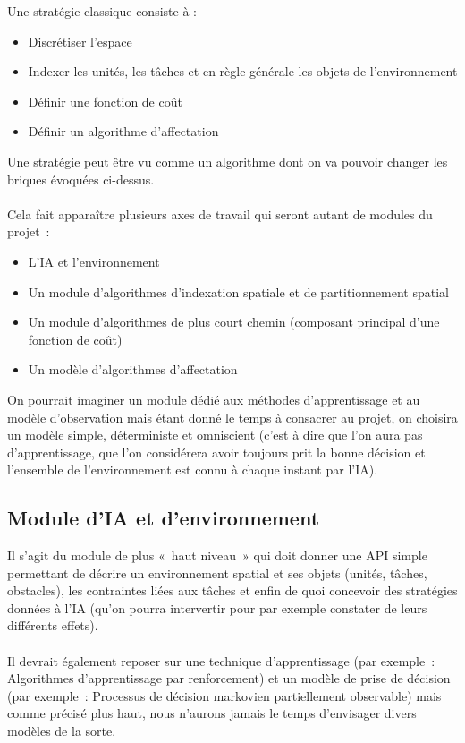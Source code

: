 Une stratégie classique consiste à :
\begin{itemize}
\item Discrétiser l'espace
\item Indexer les unités, les tâches et en règle générale les objets de l'environnement
\item Définir une fonction de coût
\item Définir un algorithme d'affectation
\end{itemize}

Une stratégie peut être vu comme un algorithme dont on va pouvoir changer les briques évoquées ci-dessus.\\\\

Cela fait apparaître plusieurs axes de travail qui seront autant de modules du projet :
\begin{itemize}
\item L'IA et l'environnement
\item Un module d'algorithmes d'indexation spatiale et  de partitionnement spatial
\item Un module d'algorithmes de plus court chemin (composant principal d'une fonction de coût)
\item Un modèle d'algorithmes d'affectation
\end{itemize}

On pourrait imaginer un module dédié aux méthodes d'apprentissage et au modèle d'observation mais étant donné le temps à consacrer au projet, on choisira un modèle simple, déterministe et omniscient (c'est à dire que l'on aura pas d'apprentissage, que l'on considérera avoir toujours prit la bonne décision et l'ensemble de l'environnement est connu à chaque instant par l'IA).

\subsection{Module d'IA et d'environnement}

Il s'agit du module de plus « haut niveau » qui doit donner une API simple permettant de décrire un environnement spatial et ses objets (unités, tâches, obstacles), les contraintes liées aux tâches et enfin de quoi concevoir des stratégies données à l'IA (qu'on pourra intervertir pour par exemple constater de leurs différents effets).\\\\

Il devrait également reposer sur une technique d'apprentissage (par exemple : Algorithmes d'apprentissage par renforcement)  et un modèle de prise de décision (par exemple : Processus de décision markovien partiellement observable) mais comme précisé plus haut, nous n'aurons jamais le temps d'envisager divers modèles de la sorte.

